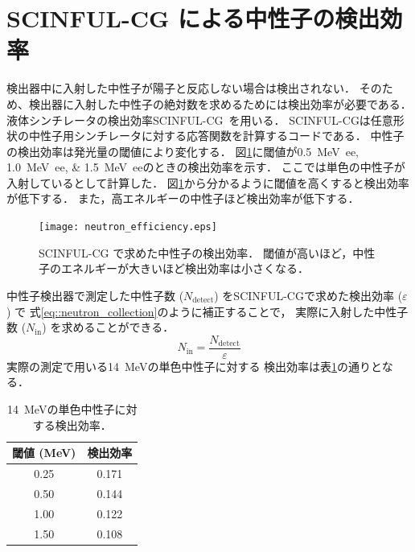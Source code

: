 \documentclass[../master]{subfiles}
\begin{document}
\section{SCINFUL-CG による中性子の検出効率}
検出器中に入射した中性子が陽子と反応しない場合は検出されない．
そのため、検出器に入射した中性子の絶対数を求めるためには検出効率が必要である．
液体シンチレータの検出効率SCINFUL-CG~\cite{scinful-cg}を用いる．
SCINFUL-CGは任意形状の中性子用シンチレータに対する応答関数を計算するコードである．
中性子の検出効率は発光量の閾値により変化する．
図\ref{fig::neutron_efficiency}に閾値が\SIlist{0.5;1.0;1.5}{\mega\electronvolt ee}のときの検出効率を示す．
ここでは単色の中性子が入射しているとして計算した．
図\ref{fig::neutron_efficiency}から分かるように閾値を高くすると検出効率が低下する．
また，高エネルギーの中性子ほど検出効率が低下する．
\begin{figure}
  \centering
  \texttt{[image: neutron\_efficiency.eps]}
  \caption[SCINFUL-CG で求めた中性子の検出効率．]
          {SCINFUL-CG で求めた中性子の検出効率．
          閾値が高いほど，中性子のエネルギーが大きいほど検出効率は小さくなる．}
  \label{fig::neutron_efficiency}
\end{figure}

中性子検出器で測定した中性子数 ($N_{\text{detect}}$) をSCINFUL-CGで求めた検出効率 ($\varepsilon$) で
式\ref{eq::neutron_collection}のように補正することで，
実際に入射した中性子数 ($N_{\text{in}}$) を求めることができる．
\begin{equation}
  N_{\text{in}} = \frac{N_{\text{detect}}}{\varepsilon}
  \label{eq::neutron_collection}
\end{equation}
実際の測定で用いる\SI{14}{\mega\electronvolt}の単色中性子に対する
検出効率は表\ref{tab::neutron_efficiency}の通りとなる．
\begin{table}
  \centering
  \caption{\SI{14}{\mega\electronvolt}の単色中性子に対する検出効率．}
  \label{tab::neutron_efficiency}
  \begin{tabular}{cc}
    \toprule
    閾値 (\si{\mega\electronvolt}) & 検出効率 \\
    \midrule
    0.25 & 0.171 \\
    0.50 & 0.144 \\
    1.00 & 0.122 \\
    1.50 & 0.108 \\
    \bottomrule
  \end{tabular}
\end{table}
\end{document}
